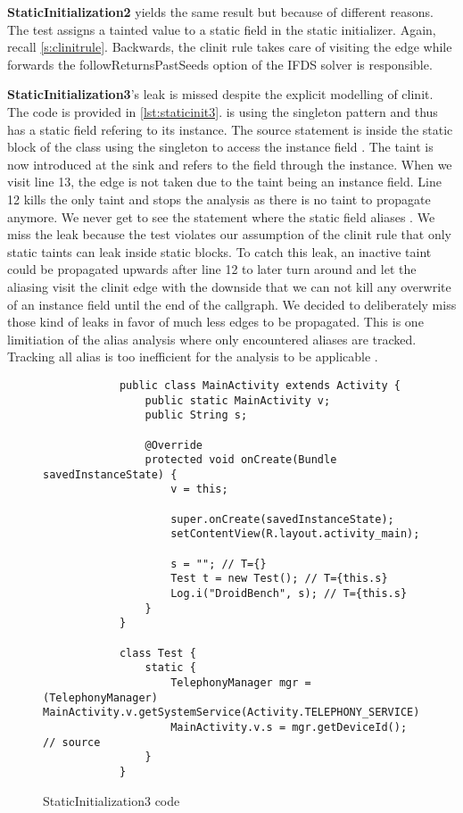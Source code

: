 \documentclass[../draft.tex]{subfiles}
\begin{document}
    \textbf{StaticInitialization2} yields the same result but because of different reasons. The test assigns a tainted value to a static field in the static initializer. Again, recall \autoref{s:clinitrule}. Backwards, the clinit rule takes care of visiting the  edge while forwards the followReturnsPastSeeds option of the IFDS solver is responsible. 

    \textbf{StaticInitialization3}'s leak is missed despite the explicit modelling of clinit. The code is provided in \autoref{lst:staticinit3}.  is using the singleton pattern and thus has a static field  refering to its instance. The source statement is inside the static block of the  class using the singleton to access the instance field .
    The taint is now introduced at the sink and refers to the field through the  instance. When we visit line 13, the  edge is not taken due to the taint being an instance field. Line 12 kills the only taint and stops the analysis as there is no taint to propagate anymore. We never get to see the statement where the static field  aliases . 
    We miss the leak because the test violates our assumption of the clinit rule that only static taints can leak inside static blocks. To catch this leak, an inactive taint could be propagated upwards after line 12 to later turn around and let the aliasing visit the clinit edge with the downside that we can not kill any overwrite of an instance field until the end of the callgraph. We decided to deliberately miss those kind of leaks in favor of much less edges to be propagated. This is one limitiation of the alias analysis where only encountered aliases are tracked. Tracking all alias is too inefficient for the analysis to be applicable \cite{Bodden2012}.  
    
    \begin{figure}
        \begin{lstlisting}
            public class MainActivity extends Activity {
                public static MainActivity v;
                public String s;

                @Override
                protected void onCreate(Bundle savedInstanceState) {
                    v = this;
                
                    super.onCreate(savedInstanceState);
                    setContentView(R.layout.activity_main);
                
                    s = ""; // T={}
                    Test t = new Test(); // T={this.s}
                    Log.i("DroidBench", s); // T={this.s}
                }
            }

            class Test {
                static {
                    TelephonyManager mgr = (TelephonyManager) MainActivity.v.getSystemService(Activity.TELEPHONY_SERVICE);
                    MainActivity.v.s = mgr.getDeviceId(); // source
                }    
            }
        \end{lstlisting}
        \caption{StaticInitialization3 code}
        \label{lst:staticinit3}
    \end{figure}
\end{document}
